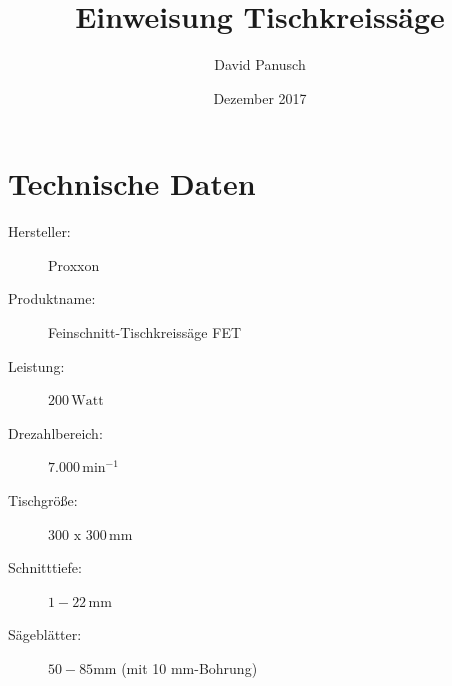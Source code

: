 \documentclass{\basedir/fablab-document}
\date{Dezember 2017}
\author{David Panusch}
\title{Einweisung Tischkreissäge}
\begin{document}
\dosecttoc
\faketableofcontents
{}
\maketitle

\section{Technische Daten}
\begin{description}
	
    \item[Hersteller:] Proxxon
    \item[Produktname:] Feinschnitt-Tischkreissäge FET
    \item[Leistung:] $200\,\mathrm{Watt}$
    \item[Drezahlbereich:] $7.000\,\mathrm{min}^{-1}$
    \item[Tischgröße:] $300 \mathrm{\,\,x\,\,} 300\,\mathrm{mm}$
    \item[Schnitttiefe:] $1 - 22\,\mathrm{mm}$ 
    \item[Sägeblätter:] $50 - 85 \mathrm{mm}$ (mit 10 mm-Bohrung)
    
\end{description}
\end{document}
